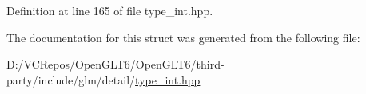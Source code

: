 Definition at line 165 of file type\+\_\+int.\+hpp.



The documentation for this struct was generated from the following file\+:\begin{DoxyCompactItemize}
\item 
D\+:/\+V\+C\+Repos/\+Open\+G\+L\+T6/\+Open\+G\+L\+T6/third-\/party/include/glm/detail/\mbox{\hyperlink{type__int_8hpp}{type\+\_\+int.\+hpp}}\end{DoxyCompactItemize}
